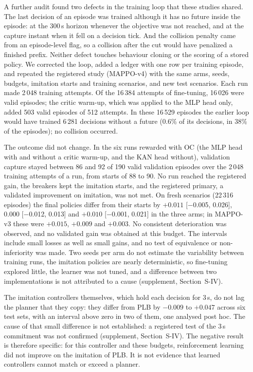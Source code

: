 \documentclass[5p,twocolumn]{elsarticle}
\begin{document}
A further audit found two defects in the training loop that these studies shared. The last decision of an episode
was trained although it has no future inside the episode: at the 300\,s horizon whenever the objective was not
reached, and at the capture instant when it fell on a decision tick. And the collision penalty came from an
episode-level flag, so a collision after the cut would have penalized a finished prefix. Neither defect touches
behaviour cloning or the scoring of a stored policy. We corrected the loop, added a ledger with one row per training
episode, and repeated the registered study (MAPPO-v4) with the same arms, seeds, budgets, imitation starts and
training scenarios, and new test scenarios. Each run made 2\,048 training attempts. Of the 16\,384 attempts of
fine-tuning, 16\,026 were valid episodes; the critic warm-up, which was applied to the MLP head only, added 503
valid episodes of 512 attempts. In these 16\,529 episodes the earlier loop would have trained 6\,281 decisions
without a future (0.6\% of its decisions, in 38\% of the episodes); no collision occurred.

The outcome did not change. In the six runs rewarded with OC (the MLP head with and without a critic warm-up, and
the KAN head without), validation capture stayed between 86 and 92 of 190 valid validation episodes over the 2\,048
training attempts of a run, from starts of 88 to 90. No run reached the registered gain, the breakers kept the
imitation starts, and the registered primary, a validated improvement on imitation, was not met. On fresh scenarios
(22\,316 episodes) the final policies differ from their starts by $+0.011$ [$-$0.005, 0.026], $0.000$
[$-$0.012, 0.013] and $+0.010$ [$-$0.001, 0.021] in the three arms; in MAPPO-v3 these were $+0.015$, $+0.009$ and
$+0.003$. No consistent deterioration was observed, and no validated gain was obtained at this budget. The intervals
include small losses as well as small gains, and no test of equivalence or non-inferiority was made. Two seeds per
arm do not estimate the variability between training runs, the imitation policies are nearly deterministic, so
fine-tuning explored little, the learner was not tuned, and a difference between two implementations is not
attributed to a cause (supplement, Section~S-IV).

The imitation controllers themselves, which hold each decision for 3\,s, do not lag the planner that they copy: they
differ from PLB by $-0.009$ to $+0.047$ across six test sets, with an interval above zero in two of them, one
analysed post hoc. The cause of that small difference is not established: a registered test of the 3\,s commitment
was not confirmed (supplement, Section~S-IV). The negative result is therefore specific: for this controller and
these budgets, reinforcement learning did not improve on the imitation of PLB. It is not evidence that learned
controllers cannot match or exceed a planner.
\end{document}
